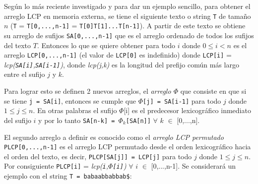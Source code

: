 Según lo más reciente investigado \cite{emsparse} y para dar un ejemplo sencillo, para obtener el arreglo LCP en memoria externa, se tiene el siguiente texto o string \texttt{T} de tamaño $n$ (\texttt{T} = \texttt{T[0,...,n-1]} = \texttt{T[0]T[1]...T[n-1]}). A partir de este texto se obtiene su arreglo de sufijos \texttt{SA[0,...,n-1]} que es el arreglo ordenado de todos los sufijos del texto $T$. Entonces lo que se quiere obtener para todo $i$ donde $0 \leq i < n$ es el arreglo \texttt{LCP[0,...,n-1]} (el valor de \texttt{LCP[0]} es indefinido) donde \texttt{LCP[i]} = \textit{lcp(\texttt{SA[i]},\texttt{SA[i-1]})}, donde \textit{lcp(j,k)} es la longitud del prefijo común más largo entre el sufijo $j$ y $k$.

Para lograr esto se definen 2 nuevos arreglos, el \textit{arreglo $\Phi$} que consiste en que si se tiene \texttt{j = SA[i]}, entonces se cumple que \texttt{$\Phi$[j] = SA[i-1]} para todo $j$ donde $1 \leq j \leq n$. En otras palabras el sufijo $\Phi$[i] es el predecesor lexicográfico inmediato del sufijo $i$ y por lo tanto \texttt{SA[n-k] = $\Phi_{k}$[SA[n]]} $\forall$ $k$ $\in$ [0,...,n].

El segundo arreglo a definir es conocido como el \textit{arreglo LCP permutado} \texttt{PLCP[0,...,n-1]} es el arreglo LCP permutado desde el orden lexicográfico hacia el orden del texto, es decir, \texttt{PLCP[SA[j]] = LCP[j]} para todo $j$ donde $1 \leq j \leq n$. Por consiguiente \texttt{PLCP[i]} = \textit{lcp(\texttt{i},\texttt{$\Phi$[i]})} $\forall$ $i$ $\in$ [0,...,n-1]. Se considerará un ejemplo con el string \texttt{T = babaabbabbab\$}:

